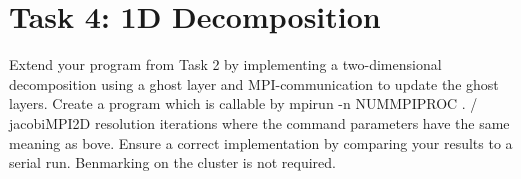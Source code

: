 \documentclass[11pt,a4paper]{article}
\begin{document}
\section{Task 4: 1D Decomposition}
Extend your program from Task 2 by implementing a two-dimensional decomposition using a ghost layer and MPI-communication to update the ghost layers. Create a program which is callable by mpirun -n NUMMPIPROC . / jacobiMPI2D resolution iterations where the command parameters have the same meaning as bove.
Ensure a correct implementation by comparing your results to a serial run. Benmarking on the cluster is not required.
\end{document}
